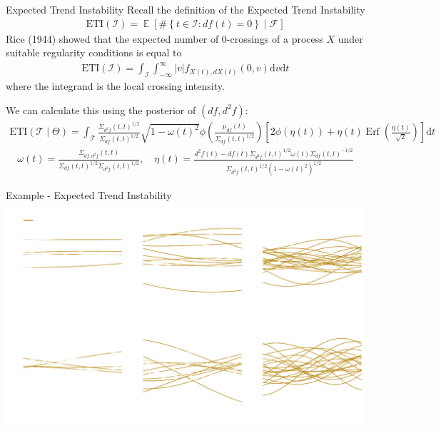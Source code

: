 \documentclass[ignorenonframetext,xcolor=pdflatex,table,dvipsnames,serif]{beamer}
\DeclareMathOperator{\E}{\mathbb{E}}
\DeclareMathOperator{\Erf}{Erf}
\begin{document}
\begin{frame}{Expected Trend Instability}
  Recall the definition of the Expected Trend Instability
  \begin{align*}
    \mathrm{ETI}(\mathcal{I}) = \E[\#\left\{t \in \mathcal{I} : df(t) = 0\right\} \mid \mathcal{F}]
  \end{align*}
  Rice (1944) showed that the expected number of 0-crossings of a process $X$ under suitable regularity conditions is equal to
  \begin{align*}
    \mathrm{ETI}(\mathcal{I}) = \int_\mathcal{I}\int_{-\infty}^\infty |v| f_{X(t), dX(t)}(0, v)\mathrm{d}v\mathrm{d}t
  \end{align*}
  where the integrand is the \alert{local crossing intensity}. 
  
  \pause
  
  \vspace{0.5cm}
  We can calculate this using the posterior of $(df, d^2\!f)$:
{\tiny
  \begin{align*}
    \mathrm{ETI}(\mathcal{T} \mid \Theta) = \int_{\mathcal{T}} \frac{\Sigma_{d^2\!f}(t,t)^{1/2}}{\Sigma_{df}(t,t)^{1/2}} \sqrt{1 - \omega(t)^2}   \phi\left(\frac{\mu_{df}(t)}{\Sigma_{df}(t,t)^{1/2}}\right)\left[2\phi(\eta(t)) + \eta(t) \Erf\left(\frac{\eta(t)}{\sqrt{2}}\right)\right]\mathrm{d}t
  \end{align*}
  \begin{align*}
  \omega(t) = \frac{\Sigma_{df,d^2\!f}(t,t)}{\Sigma_{df}(t,t)^{1/2}\Sigma_{d^2\!f}(t,t)^{1/2}}, \quad \eta(t) = \frac{d^2\!f(t) - df(t)\Sigma_{d^2\!f}(t,t)^{1/2}\omega(t)\Sigma_{df}(t,t)^{-1/2}}{\Sigma_{d^2\!f}(t,t)^{1/2}(1 - \omega(t)^2)^{1/2}}
  \end{align*}
}
\end{frame}


\begin{frame}{Example - Expected Trend Instability}
  \center\includegraphics[scale=0.55]{ETIexample}
\end{frame}
\end{document}
